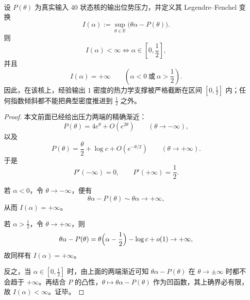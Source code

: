 \begin{theorem}[输出密度的半饱和支撑屏障]\label{thm:conclusion-realinput40-output-density-halfsaturation-support}
设 \(P(\theta)\) 为真实输入 \(40\) 状态核的输出位势压力，并定义其 Legendre--Fenchel 变换
\[
I(\alpha):=\sup_{\theta\in\mathbb R}\bigl(\theta\alpha-P(\theta)\bigr).
\]
则
\[
I(\alpha)<\infty \iff \alpha\in\left[0,\frac12\right],
\]
并且
\[
I(\alpha)=+\infty
\qquad
\left(\alpha<0\ \text{或}\ \alpha>\frac12\right).
\]
因此，在该核上，经验输出 \(1\) 密度的热力学支撑被严格截断在区间 \([0,\tfrac12]\) 内；任何指数倾斜都不能把典型密度推进到 \(\tfrac12\) 之外。
\end{theorem}

\begin{proof}
本文前面已经给出压力两端的精确渐近：
\[
P(\theta)=4e^\theta+O(e^{2\theta})
\qquad (\theta\to-\infty),
\]
以及
\[
P(\theta)=\frac{\theta}{2}+\log c+O(e^{-\theta/2})
\qquad (\theta\to+\infty).
\]
于是
\[
P'(-\infty)=0,
\qquad
P'(+\infty)=\frac12.
\]

若 \(\alpha<0\)，令 \(\theta\to-\infty\)，便有
\[
\theta\alpha-P(\theta)\sim \theta\alpha\to+\infty,
\]
从而 \(I(\alpha)=+\infty\)。

若 \(\alpha>\tfrac12\)，令 \(\theta\to+\infty\)，则
\[
\theta\alpha-P(\theta)
=
\theta\Bigl(\alpha-\frac12\Bigr)-\log c+o(1)\to+\infty,
\]
故同样有 \(I(\alpha)=+\infty\)。

反之，当 \(\alpha\in[0,\tfrac12]\) 时，由上面的两端渐近可知 \(\theta\alpha-P(\theta)\) 在 \(\theta\to\pm\infty\) 时都不会趋于 \(+\infty\)。再结合 \(P\) 的凸性，\(\theta\mapsto \theta\alpha-P(\theta)\) 作为凹函数，其上确界必有限，故 \(I(\alpha)<\infty\)。证毕。
\end{proof}


